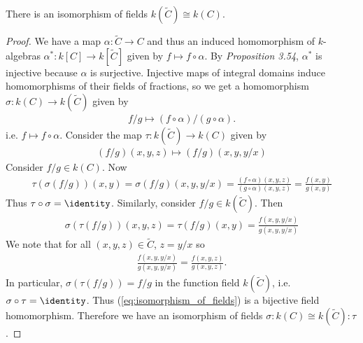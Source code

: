 \documentclass{article}
\begin{document}
\begin{claim*}[3b]
  There is an isomorphism of fields $k(\tilde C)\cong k(C)$.
  \begin{proof}
    We have a map $\alpha:\tilde C\to C$ and thus an induced homomorphism
    of $k$-algebras $\alpha^* : k[C]\to k[\tilde C]$ given by
    $f \mapsto f\circ\alpha$. By \emph{Proposition 3.54}, $\alpha^*$ is injective
    because $\alpha$ is surjective. Injective maps of integral domains induce
    homomorphisms of their fields of fractions, so we get a homomorphism
    $\sigma:k(C)\to k(\tilde C)$ given by
    \begin{align}\label{eq:isomorphism_of_fields}
      f/g\mapsto (f\circ\alpha)/(g\circ\alpha).
    \end{align}
    i.e. $f\mapsto f\circ\alpha$.
    Consider the map $\tau : k(\tilde C)\to k(C)$ given by
    \begin{align*}
      (f/g)(x,y,z)\mapsto (f/g)(x,y,y/x)
    \end{align*}
    Consider $f/g\in k(C)$. Now
    \begin{align*}
      \tau(\sigma(f/g))(x,y)
      = \sigma(f/g)(x,y,y/x)
      = \frac{(f\circ\alpha)(x,y,z)}{(g\circ\alpha)(x,y,z)}
      = \frac{f(x,y)}{g(x,y)}
    \end{align*}
    Thus $\tau\circ\sigma = \identity$. Similarly, consider $f/g\in k(\tilde C)$. Then
    \begin{align*}
      \sigma(\tau(f/g))(x,y,z) = \tau(f/g)(x,y) = \frac{f(x,y,y/x)}{g(x,y,y/x)}
    \end{align*}
    We note that for all $(x,y,z)\in\tilde C$, $z=y/x$ so
    \begin{align*}
      \frac{f(x,y,y/x)}{g(x,y,y/x)}  = \frac{f(x,y,z)}{g(x,y,z)}.
    \end{align*}
    In particular, $\sigma(\tau(f/g)) = f/g$ in the function field $k(\tilde C)$, i.e.
    $\sigma\circ\tau = \identity$. Thus (\ref{eq:isomorphism_of_fields}) is a bijective
    field homomorphism. Therefore we have an isomorphism of fields
    $\sigma : k(C)\cong k(\tilde C):\tau$.
  \end{proof}
\end{claim*}
\end{document}
